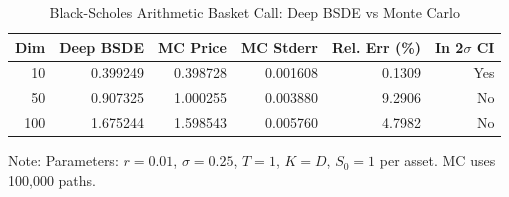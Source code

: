 \begin{table}[htbp]
\centering
\caption{Black-Scholes Arithmetic Basket Call: Deep BSDE vs Monte Carlo}
\label{tab:bs_basket_results}
\begin{tabular}{@{}rrrrrr@{}}
\toprule
\textbf{Dim} & \textbf{Deep BSDE} & \textbf{MC Price} & \textbf{MC Stderr} & \textbf{Rel. Err (\%)} & \textbf{In 2$\sigma$ CI} \\
\midrule
10 & 0.399249 & 0.398728 & 0.001608 & 0.1309 & Yes \\
50 & 0.907325 & 1.000255 & 0.003880 & 9.2906 & No \\
100 & 1.675244 & 1.598543 & 0.005760 & 4.7982 & No \\
\bottomrule
\end{tabular}
\begin{tablenotes}
\small
\item Note: Parameters: $r = 0.01$, $\sigma = 0.25$, $T = 1$, $K = D$, $S_0 = 1$ per asset. MC uses 100,000 paths.
\end{tablenotes}
\end{table}

